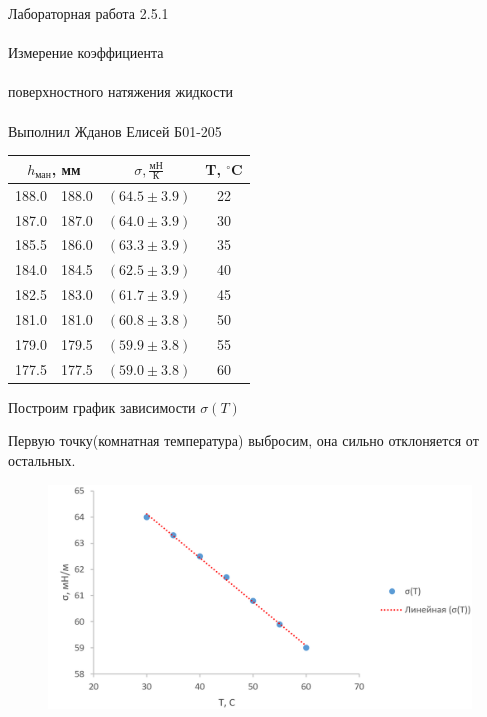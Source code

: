\documentclass{astroedu-lab}
\begin{document}
\begin{problem}{\huge Лабораторная работа 2.5.1\\\\Измерение коэффициента\\\\поверхностного натяжения жидкости\\\\Выполнил Жданов Елисей Б01-205}
\begin{center}
\begin{tabular}{|c|c|c|c|}
\hline 
\multicolumn{2}{|c|}{$h_\text{ман}$, мм} & $\sigma, \frac{\text{мН}}{\text{К}}$ & T, $^\circ$C \\
\hline
188.0 & 188.0 & $(64.5 \pm 3.9)$ & 22\\
187.0 & 187.0 & $(64.0 \pm 3.9)$ & 30\\
185.5 & 186.0 & $(63.3 \pm 3.9)$ & 35\\
184.0 & 184.5 & $(62.5 \pm 3.9)$ & 40\\
182.5 & 183.0 & $(61.7 \pm 3.9)$ & 45\\
181.0 & 181.0 & $(60.8 \pm 3.8)$ & 50\\
179.0 & 179.5 & $(59.9 \pm 3.8)$ & 55\\
177.5 & 177.5 & $(59.0 \pm 3.8)$ & 60\\
\hline
\end{tabular}
\end{center}

Построим график зависимости $\sigma(T)$

Первую точку(комнатная температура) выбросим, она сильно отклоняется от остальных.

\begin{center}
\end{center}

\begin{figure}[!h]
	\centering
	\includegraphics[width=1\textwidth]{2023-02-23_21-33-13.png}
	\label{fig:boiler}
\end{figure}

\newpage


\end{problem}
\end{document}
